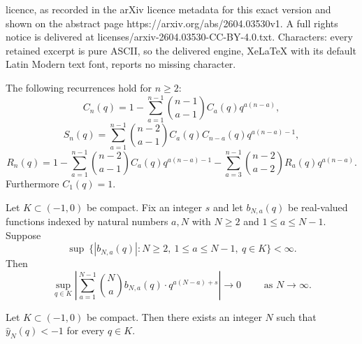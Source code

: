\documentclass[10pt,a4paper]{amsart}
\begin{document}
licence, as recorded in the arXiv licence metadata for this exact version and shown on the abstract page https://arxiv.org/abs/2604.03530v1. A full rights notice is delivered at licenses/arxiv-2604.03530-CC-BY-4.0.txt. Characters: every retained excerpt is pure ASCII, so the delivered engine, XeLaTeX with its default Latin Modern text font, reports no missing character.
\begin{proposition}\label{prop:recurrences}
The following recurrences hold for $n \geq 2$:
\begin{equation}\label{eq:complete-rec}
C_n(q)=1-\sum_{a=1}^{n-1} \binom{n-1}{a-1}C_a(q)q^{a(n-a)},   
\end{equation}
\begin{equation}\label{eq:split-rec}
S_n(q)=\sum_{a=1}^{n-1} \binom{n-2}{a-1} C_a(q)C_{n-a}(q)q^{a(n-a)-1},
\end{equation}
\begin{equation}\label{eq:rminus-rec}
R_n(q)=1 - \sum_{a=1}^{n-1} \binom{n-2}{a-1} C_a(q) q^{a(n-a)-1} - \sum_{a=3}^{n-1} \binom{n-2}{a-2} R_a(q) q^{a(n-a)}.
\end{equation}
Furthermore $C_1(q)=1$.
\end{proposition}

\begin{lemma}\label{lem:kernel}
Let $K \subset (-1,0)$ be compact. Fix an integer $s$ and let $b_{N,a}(q)$ be real-valued functions indexed by natural numbers $a,N$ with $N \geq 2$ and $1 \leq a \leq N-1$. Suppose
\[
\sup \ \{ |b_{N,a}(q)| \colon N \geq 2, \ 1 \leq a \leq N-1, \ q \in K \} <\infty.
\]
Then
\[
\sup_{q \in K} \left| \sum_{a=1}^{N-1} \binom{N}{a}b_{N,a}(q) \cdot q^{a(N-a)+s} \right| \to 0 \qquad \text{ as } N \to \infty.
\]
\end{lemma}

\begin{proposition}\label{prop:yn}
Let $K \subset (-1,0)$ be compact. Then there exists an integer $N$ such that $\hat{y}_N(q)<-1$ for every $q \in K$.
\end{proposition}
\end{document}
